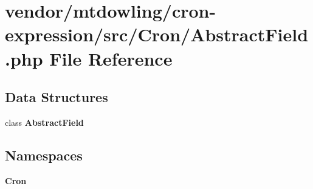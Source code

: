 \section{vendor/mtdowling/cron-\/expression/src/\+Cron/\+Abstract\+Field.php File Reference}
\label{_abstract_field_8php}
\subsection*{Data Structures}
\begin{DoxyCompactItemize}
\item 
class {\bf Abstract\+Field}
\end{DoxyCompactItemize}
\subsection*{Namespaces}
\begin{DoxyCompactItemize}
\item 
 {\bf Cron}
\end{DoxyCompactItemize}
